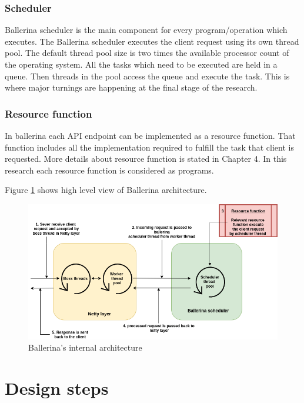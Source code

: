 \subsubsection{Scheduler}

Ballerina scheduler is the main component for every program/operation which executes. The Ballerina scheduler executes the client request using its own thread pool. The default thread pool size is two times the available processor count of the operating system. All the tasks which need to be executed are held in a queue. Then threads in the pool access the queue and execute the task. This is where major turnings are happening at the final stage of the research. 

\subsubsection{Resource function}

In ballerina each API endpoint can be implemented as a resource function. That function includes all the implementation required to fulfill the task that client is requested. More details about resource function is stated in Chapter 4. In this research each resource function is considered as programs.


Figure \ref{bal_internal} shows high level view of Ballerina architecture.

\begin{figure}[htbp]
	\begin{center}
		\includegraphics[scale=0.5]{figures/bal-internal.png}
	\end{center}
	\caption{Ballerina's internal architecture}
	\label{bal_internal}
\end{figure}

\section{Design steps}

